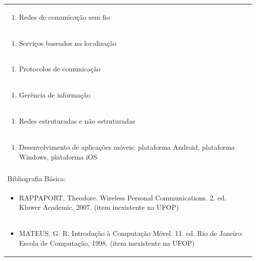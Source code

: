 \documentclass[11pt]{article}
\begin{document}
\begin{center}
\begin{longtable}{|p{4cm}|p{4cm}|p{4cm}|p{4cm}|}
\multicolumn{4}{|p{\dimexpr 16cm + 6\tabcolsep\relax}|}{\begin{enumerate}[start=2]\item Redes de comunicação sem fio\end{enumerate}}\\
\multicolumn{4}{|p{\dimexpr 16cm + 6\tabcolsep\relax}|}{\begin{enumerate}[start=3]\item Serviços baseados na localização\end{enumerate}}\\
\multicolumn{4}{|p{\dimexpr 16cm + 6\tabcolsep\relax}|}{\begin{enumerate}[start=4]\item Protocolos de comunicação\end{enumerate}}\\
\multicolumn{4}{|p{\dimexpr 16cm + 6\tabcolsep\relax}|}{\begin{enumerate}[start=5]\item Gerência de informação\end{enumerate}}\\
\multicolumn{4}{|p{\dimexpr 16cm + 6\tabcolsep\relax}|}{\begin{enumerate}[start=6]\item Redes estruturadas e não estruturadas\end{enumerate}}\\
\multicolumn{4}{|p{\dimexpr 16cm + 6\tabcolsep\relax}|}{\begin{enumerate}[start=7]\item Desenvolvimento de aplicações móveis: plataforma Android, plataforma Windows, plataforma iOS\end{enumerate}}\\
\multicolumn{4}{|p{\dimexpr 16cm + 6\tabcolsep\relax}|}{}\\
\hline
\multicolumn{4}{|p{16cm}|}{Bibliografia Básica:}\\*
\multicolumn{4}{|p{\dimexpr 16cm + 6\tabcolsep\relax}|}{\begin{itemize}\item RAPPAPORT, Theodore. Wireless Personal Communications. 2. ed. Kluwer Academic, 2007. (item inexistente na UFOP)\end{itemize}}\\
\multicolumn{4}{|p{\dimexpr 16cm + 6\tabcolsep\relax}|}{\begin{itemize}\item MATEUS, G. R. Introdução à Computação Móvel. 11. ed. Rio de Janeiro: Escola de Computação, 1998. (item inexistente na UFOP)\end{itemize}}\\

\end{longtable}
\end{center}
\end{document}
